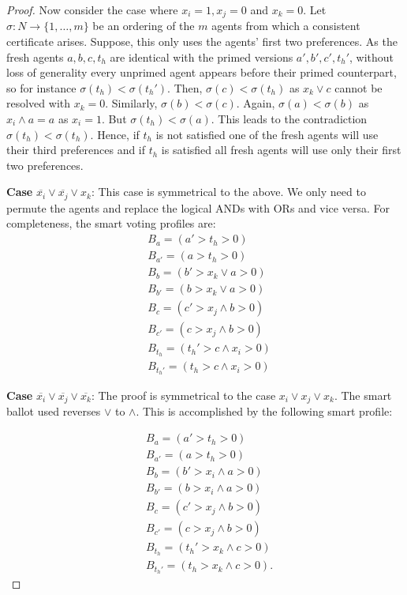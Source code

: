 \documentclass[11pt,a4paper, titlepage]{article}
\theoremstyle{definition}
\begin{document}
\begin{proof}
    Now consider the case where $x_i = 1, x_j = 0$ and $x_k = 0$. Let $\sigma \colon N \longrightarrow \{1, \ldots, m\}$ be an ordering of the $m$ agents from which a consistent certificate arises. Suppose, this only uses the agents' first two preferences.
    As the fresh agents $a, b, c, t_h$ are identical with the primed versions $a', b', c', t_h'$, without loss of generality every unprimed agent appears before their primed counterpart, so for instance $\sigma(t_h) < \sigma(t_h')$. 
    Then, $\sigma(c) < \sigma(t_h)$ as $x_k \lor c$ cannot be resolved with $x_k = 0$. 
    Similarly, $\sigma(b) < \sigma(c)$. Again, $ \sigma(a) < \sigma(b)$ as $x_i \land a = a$ as $x_i = 1$. But $\sigma(t_h) < \sigma(a)$. This leads to the contradiction $\sigma(t_h) < \sigma(t_h)$. 
    Hence, if $t_h$ is not satisfied one of the fresh agents will use their third preferences and if $t_h$ is satisfied all fresh agents will use only their first two preferences.

    \textbf{Case} $\overline{x_i} \lor \overline{x_j} \lor x_k$: This case is symmetrical to the above. We only need to permute the agents and replace the logical ANDs with ORs and vice versa. For completeness, the smart voting profiles are:     \begin{align*}
        &B_a = (a' > t_h > 0) \\
        &B_{a'} = (a > t_h > 0) \\
        &B_{b} = (b' > x_k \lor a > 0) \\
        &B_{b'} = (b > x_k \lor a > 0) \\
        &B_{c} = (c' > x_j \land b > 0) \\
        &B_{c'} = (c > x_j \land b > 0) \\
        &B_{t_h} = (t_h' > c \land x_i > 0) \\
        &B_{t_h'} = (t_h > c \land x_i > 0)
    \end{align*}

    \textbf{Case} $\overline{x_i} \lor \overline{x_j} \lor \overline{x_k}$: The proof is symmetrical to the case $x_i \lor x_j \lor x_k$. The smart ballot used reverses $\lor$ to $\land$. This is accomplished by the following smart profile:

    \begin{align*}
        &B_a = (a' > t_h > 0) \\
        &B_{a'} = (a > t_h > 0) \\
        &B_{b} = (b' > x_i \land a > 0) \\
        &B_{b'} = (b > x_i \land a > 0) \\
        &B_{c} = (c' > x_j \land b > 0) \\
        &B_{c'} = (c > x_j \land b > 0) \\
        &B_{t_h} = (t_h' > x_k \land c > 0) \\
        &B_{t_h'} = (t_h > x_k \land c > 0).
    \end{align*}


\end{proof}
\end{document}
